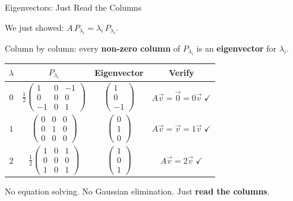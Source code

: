 \documentclass[10pt]{beamer}
\theoremstyle{definition}
\newcommand{\x}[1]{\alert{\textbf{#1}}}
\begin{document}
%
\begin{frame}{Eigenvectors: Just Read the Columns}

We just showed: $A\, P_{\lambda_i} = \lambda_i\, P_{\lambda_i}$.

\vfill

Column by column: every \x{non-zero column} of $P_{\lambda_i}$ is an \x{eigenvector} for $\lambda_i$.

\vfill

\begin{center}
\renewcommand{\arraystretch}{1.5}
\begin{tabular}{c|c|c|c}
$\lambda$ & $P_{\lambda_i}$ & Eigenvector & Verify \\
\hline
$0$ & $\frac{1}{2}\left(\begin{smallmatrix}1&0&-1\\0&0&0\\-1&0&1\end{smallmatrix}\right)$
    & $\left(\begin{smallmatrix}1\\0\\-1\end{smallmatrix}\right)$
    & $A\vec{v} = \vec{0} = 0\vec{v}\;\checkmark$ \\
$1$ & $\left(\begin{smallmatrix}0&0&0\\0&1&0\\0&0&0\end{smallmatrix}\right)$
    & $\left(\begin{smallmatrix}0\\1\\0\end{smallmatrix}\right)$
    & $A\vec{v} = \vec{v} = 1\vec{v}\;\checkmark$ \\
$2$ & $\frac{1}{2}\left(\begin{smallmatrix}1&0&1\\0&0&0\\1&0&1\end{smallmatrix}\right)$
    & $\left(\begin{smallmatrix}1\\0\\1\end{smallmatrix}\right)$
    & $A\vec{v} = 2\vec{v}\;\checkmark$
\end{tabular}
\end{center}

\vfill

No equation solving. No Gaussian elimination. Just \x{read the columns}.

\end{frame}
\end{document}
